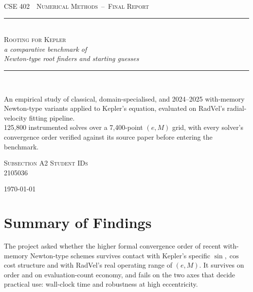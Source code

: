 \documentclass[11pt,a4paper]{article}
\begin{document}
\begin{titlepage}
\pagecolor{Paper}
\thispagestyle{empty}
\begin{center}
  \vspace*{1.6cm}
  {\color{Accent}\scshape\large CSE 402 \,\textbar\, Numerical Methods\, --\, Final Report}\\[0.6cm]
  {\color{Rule}\rule{0.55\textwidth}{0.8pt}}\\[1.1cm]

  {\color{Ink}\scshape\Huge Rooting for Kepler}\\[0.35cm]
  {\color{Muted}\Large\itshape a comparative benchmark of\\[2pt] Newton-type root finders and starting guesses}\\[1.4cm]

  {\color{Rule}\rule{0.32\textwidth}{0.6pt}}\\[1.1cm]

  \begin{minipage}{0.76\textwidth}
    \centering
    \small\color{Muted}
    An empirical study of classical, domain-specialised, and 2024--2025
    with-memory Newton-type variants applied to Kepler's equation,
    evaluated on RadVel's radial-velocity fitting pipeline.\\[0.7em]
    \normalcolor\color{Ink}
    125{,}800 instrumented solves over a 7{,}400-point $(e,M)$ grid,
    with every solver's convergence order verified against its source
    paper before entering the benchmark.
  \end{minipage}

  \vspace{2.0cm}
  {\scshape\color{Accent}\footnotesize Subsection A2 \quad\textbar\quad Student IDs}\\[0.35cm]
  {\color{Ink}2105036    }

  \vfill
  {\footnotesize\color{Muted}\today}
\end{center}
\end{titlepage}

\setcounter{page}{1}

\section*{Summary of Findings}

The project asked whether the higher formal convergence order of recent
with-memory Newton-type schemes survives contact with Kepler's specific
$\sin,\cos$ cost structure and with RadVel's real operating range of
$(e,M)$. It survives on order and on evaluation-count economy, and fails
on the two axes that decide practical use: wall-clock time and robustness
at high eccentricity.
\end{document}
